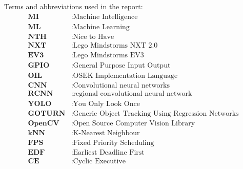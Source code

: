 
Terms and abbreviations used in the report:
\begin{align*}
    \textbf{MI} &: \text{Machine Intelligence} \\
    \textbf{ML} &: \text{Machine Learning} \\
    \textbf{NTH} &: \text{Nice to Have} \\
    \textbf{NXT} &: \text{Lego Mindstorms NXT 2.0} \\
    \textbf{EV3} &: \text{Lego Mindstorms EV3} \\  
    \textbf{GPIO} &: \text{General Purpose Input Output} \\
    \textbf{OIL} &: \text{OSEK Implementation Language} \\
    \textbf{CNN} &: \text{Convolutional neural networks} \\ 
    \textbf{RCNN} &: \text{regional convolutional neural network} \\ 
    \textbf{YOLO} &: \text{You Only Look Once} \\ 
    \textbf{GOTURN} &: \text{Generic Object Tracking Using Regression Networks} \\
    \textbf{OpenCV} &: \text{Open Source Computer Vision Library} \\
    \textbf{kNN} &: \text{K-Nearest Neighbour} \\
    \textbf{FPS} &: \text{Fixed Priority Scheduling} \\
    \textbf{EDF} &: \text{Earliest Deadline First} \\
    \textbf{CE} &: \text{Cyclic Executive} \\
\end{align*}
